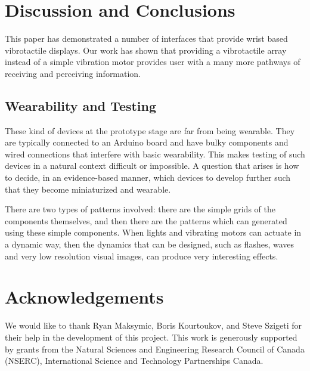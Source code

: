\documentclass{chi-ext}
\begin{document}
\section{Discussion and Conclusions}
This paper has demonstrated a number of interfaces that provide wrist based vibrotactile displays. Our work has shown that providing a vibrotactile array instead of a simple vibration motor provides user with a many more pathways of receiving and perceiving information.

\subsection{Wearability and Testing}
These kind of devices at the prototype stage are far from being wearable. They are typically connected to an Arduino board and have bulky components and wired connections that interfere with basic wearability. This makes testing of such devices in a natural context difficult or impossible. A question that arises is how to decide, in an evidence-based manner, which devices to develop further such that they become miniaturized and wearable. 

There are two types of patterns involved: there are the simple grids of the components themselves, and then there are the patterns which can generated using these simple components. When lights and vibrating motors can actuate in a dynamic way, then the dynamics that can be designed, such as flashes, waves and very low resolution visual images, can produce very interesting effects. 



\section{Acknowledgements}

We would like to thank Ryan Maksymic, Boris Kourtoukov, and Steve Szigeti for their help in the development of this project. This work is generously supported by grants from the Natural Sciences and Engineering Research Council of Canada (NSERC), International Science and Technology Partnerships Canada.

\balance


\end{document}
